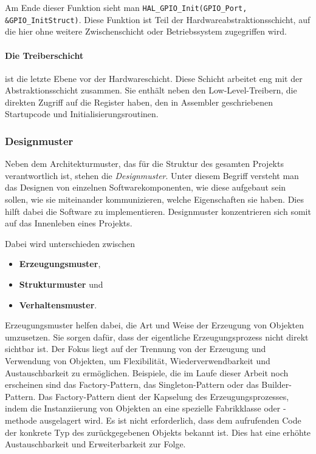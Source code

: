 Am Ende dieser Funktion sieht man \texttt{HAL\_GPIO\_Init(GPIO\_Port, \&GPIO\_InitStruct)}.
Diese Funktion ist Teil der Hardwareabstraktionsschicht, auf die hier ohne weitere Zwischenschicht oder Betriebssystem zugegriffen wird.

\paragraph{Die Treiberschicht} 
ist die letzte Ebene vor der Hardwareschicht.
Diese Schicht arbeitet eng mit der Abstraktionsschicht zusammen.
Sie enthält neben den Low-Level-Treibern, die direkten Zugriff auf die Register haben, den in Assembler geschriebenen Startupcode und Initialisierungsroutinen.


\subsubsection{Designmuster} \label{chap3_2_1_designmuster}
Neben dem Architekturmuster, das für die Struktur des gesamten Projekts verantwortlich ist, stehen die \emph{Designmuster}.
Unter diesem Begriff versteht man das Designen von einzelnen Softwarekomponenten, wie diese aufgebaut sein sollen, wie sie miteinander kommunizieren, welche Eigenschaften sie haben.
Dies hilft dabei die Software zu implementieren.
Designmuster konzentrieren sich somit auf das Innenleben eines Projekts.\cite{gfg_DesignVsArchitecture}

Dabei wird unterschieden zwischen
\begin{itemize}
	\item \textbf{Erzeugungsmuster},
	\item \textbf{Strukturmuster} und
	\item \textbf{Verhaltensmuster}.
\end{itemize}

Erzeugungsmuster helfen dabei, die Art und Weise der Erzeugung von Objekten umzusetzen.
Sie sorgen dafür, dass der eigentliche Erzeugungsprozess nicht direkt sichtbar ist.
Der Fokus liegt auf der Trennung von der Erzeugung und Verwendung von Objekten, um Flexibilität, Wiederverwendbarkeit und Austauschbarkeit zu ermöglichen.
Beispiele, die im Laufe dieser Arbeit noch erscheinen sind das Factory-Pattern, das Singleton-Pattern oder das Builder-Pattern.
Das Factory-Pattern dient der Kapselung des Erzeugungsprozesses, indem die Instanziierung von Objekten an eine spezielle Fabrikklasse oder -methode ausgelagert wird. 
Es ist nicht erforderlich, dass dem aufrufenden Code der konkrete Typ des zurückgegebenen Objekts bekannt ist. 
Dies hat eine erhöhte Austauschbarkeit und Erweiterbarkeit zur Folge.

